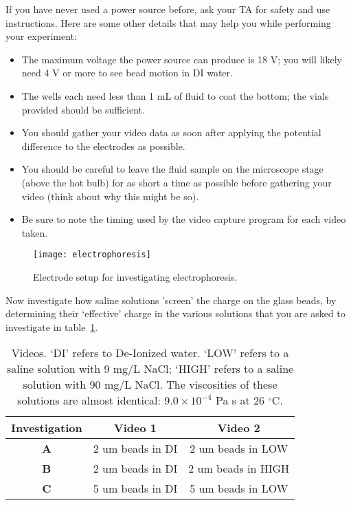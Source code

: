 \noindent
If you have never used a power source before, ask your TA for safety and use instructions. Here are some other details that may help you while performing your experiment:

\begin{itemize}
\itemsep-0.3em
\item The maximum voltage the power source can produce is 18 V; you will likely need 4 V or more to see bead motion in DI water.
\item The wells each need less than 1 mL of fluid to coat the bottom; the vials provided should be sufficient.
\item You should gather your video data as soon after applying the potential difference to the
electrodes as possible.
\item You should be careful to leave the fluid sample on the microscope stage (above the hot
bulb) for as short a time as possible before gathering your video (think about why this might
be so).
\item Be sure to note the timing used by the video capture program for each video taken.
\end{itemize}

\begin{figure}[hbtp]
	\centering
	\texttt{[image: electrophoresis]}
	\caption{Electrode setup for investigating electrophoresis.}
	\label{fig:electroph}
\end{figure}

Now investigate how saline solutions 'screen' the charge on the glass beads, by determining their `effective' charge in the various solutions that you are asked to investigate in table~\ref{tab:lab7-vids}.

\begin{table}[ht]
	\centering
	\begin{tabular}{|c|c|c|}
	\hline 
	\textbf{Investigation} & \textbf{Video 1} & \textbf{Video 2} \\ 
	\hline 
	\textbf{A} & 2 um beads in DI & 2 um beads in LOW \\ 
	\hline 
	\textbf{B} & 2 um beads in DI & 2 um beads in HIGH \\ 
	\hline 
	\textbf{C} & 5 um beads in DI & 5 um beads in LOW \\ 
	\hline 
	\end{tabular}
	\caption{Videos. `DI' refers to De-Ionized water. `LOW' refers to a saline solution with 9 mg/L NaCl; `HIGH' refers to a saline solution with 90 mg/L NaCl. The viscosities of these solutions are almost identical: $9.0 \times 10^{-4}$ Pa s at 26 $^{\circ}$C.}
	\label{tab:lab7-vids}
\end{table} 

